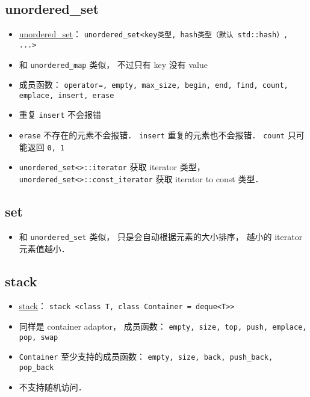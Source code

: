 \subsection{unordered\_set}
\begin{itemize}
\item \href{https://cplusplus.com/reference/unordered_set/unordered_set/}{unordered\_set}： \verb|unordered_set<key类型, hash类型（默认 std::hash）, ...>|
\item 和 \verb|unordered_map| 类似， 不过只有 key 没有 value
\item 成员函数： \verb|operator=, empty, max_size, begin, end, find, count, emplace, insert, erase|
\item 重复 \verb|insert| 不会报错
\item \verb|erase| 不存在的元素不会报错． \verb|insert| 重复的元素也不会报错． \verb|count| 只可能返回 \verb|0, 1|
\item \verb|unordered_set<>::iterator| 获取 iterator 类型， \verb|unordered_set<>::const_iterator| 获取 iterator to const 类型．
\end{itemize}

\subsection{set}
\begin{itemize}
\item 和 \verb|unordered_set| 类似， 只是会自动根据元素的大小排序， 越小的 iterator 元素值越小．
\end{itemize}

\subsection{stack}
\begin{itemize}
\item \href{https://cplusplus.com/reference/stack/stack/}{stack}： \verb|stack <class T, class Container = deque<T>>|
\item 同样是 container adaptor， 成员函数： \verb|empty, size, top, push, emplace, pop, swap|
\item \verb|Container| 至少支持的成员函数： \verb|empty, size, back, push_back, pop_back|
\item 不支持随机访问．
\end{itemize}

